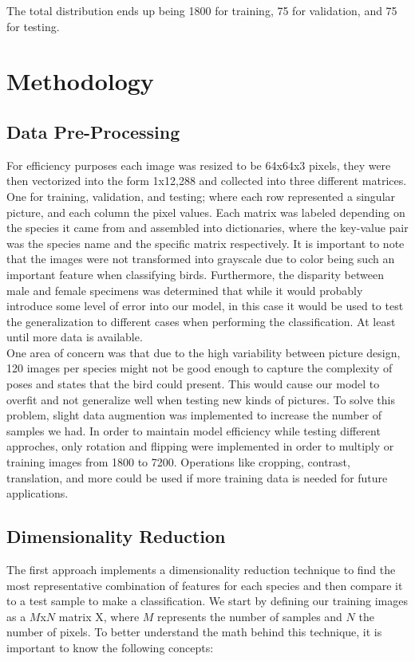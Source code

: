 \documentclass[11pt]{article}
\begin{document}
\begin{singlespace}
The total distribution ends up being 1800 for training, 75 for validation, and 75 for testing. 

\section{Methodology}
\subsection{Data Pre-Processing}

For efficiency purposes each image was resized to be 64x64x3 pixels, they were then vectorized into the form 1x12,288 and collected into three different matrices. One for training, validation, and testing; where each row represented a singular picture, and each column the pixel values. Each matrix was labeled depending on the species it came from and assembled into dictionaries, where the key-value pair was the species name and the specific matrix respectively. It is important to note that the images were not transformed into grayscale due to color being such an important feature when classifying birds. Furthermore, the disparity between male and female specimens was determined that while it would probably introduce some level of error into our model, in this case it would be used to test the generalization to different cases when performing the classification. At least until more data is available.\\

One area of concern was that due to the high variability between picture design, 120 images per species might not be good enough to capture the complexity of poses and states that the bird could present. This would cause our model to overfit and not generalize well when testing new kinds of pictures. To solve this problem, slight data augmention was implemented to increase the number of samples we had. In order to maintain model efficiency while testing different approches, only rotation and flipping were implemented in order to multiply or training images from 1800 to 7200. Operations like cropping, contrast, translation, and more could be used if more training data is needed for future applications. 

\subsection{Dimensionality Reduction}
The first approach implements a dimensionality reduction technique to find the most representative combination of features for each species and then compare it to a test sample to make a classification. We start by defining our training images as a $M$x$N$ matrix X, where $M$ represents the number of samples and $N$ the number of pixels. To better understand the math behind this technique, it is important to know the following concepts:


\end{singlespace}
\end{document}

